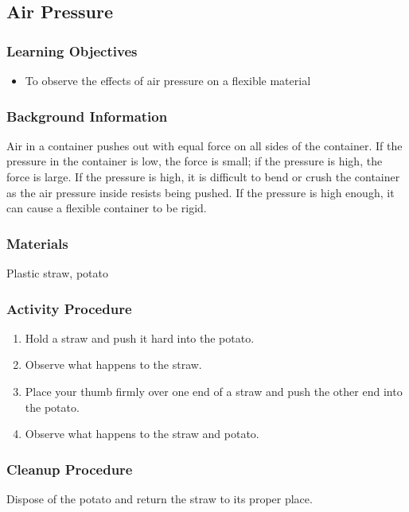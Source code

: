 \subsection{Air Pressure}

\subsubsection*{Learning Objectives}
\begin{itemize}
\item{To observe the effects of air pressure on a flexible material}
\end{itemize}

\subsubsection*{Background Information}
Air in a container pushes out with equal force on all sides of the container. If the pressure in the container is low, the force is small; if the pressure is high, the force is large. If the pressure is high, it is difficult to bend or crush the container as the air pressure inside resists being pushed. If the pressure is high enough, it can cause a flexible container to be rigid.

\subsubsection*{Materials}
Plastic straw, potato

\subsubsection*{Activity Procedure}
\begin{enumerate}
\item{Hold a straw and push it hard into the potato.}
\item{Observe what happens to the straw.}
\item{Place your thumb firmly over one end of a straw and push the other end into the potato.}
\item{Observe what happens to the straw and potato.}
\end{enumerate}

\subsubsection*{Cleanup Procedure}
Dispose of the potato and return the straw to its proper place.


